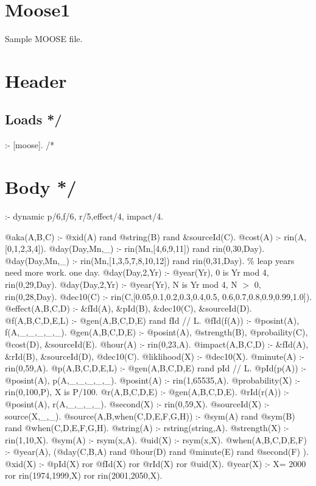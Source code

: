 \documentclass{article}
\begin{document}
\tableofcontents

\clearpage
\section{Moose1\label{Moose1}}


Sample MOOSE file.

\section{Header\label{Header}}
\subsection*{Loads */\label{Loads_}}


:- [moose]. /*

\section{Body */\label{Body_}}


:- dynamic p/6,f/6, r/5,effect/4, impact/4.



@aka(A,B,C) :- 
	@xid(A)
        rand @string(B) 
         rand \&sourceId(C).
@cost(A) :- 
	rin(A,[0,1,2,3,4]).
@day(Day,Mn,\_) :- 
	rin(Mn,[4,6,9,11]) 
        rand rin(0,30,Day).
@day(Day,Mn,\_) :- 
	rin(Mn,[1,3,5,7,8,10,12]) 
        rand rin(0,31,Day).
\% leap years need more work. one day.
@day(Day,2,Yr) :- 
	@year(Yr), 
	0 is Yr mod 4, 
	rin(0,29,Day).
@day(Day,2,Yr) :- 
	@year(Yr), 
	N is Yr mod 4, 
	N $>$ 0, 
	rin(0,28,Day).
@dec10(C) :-
	rin(C,[0.05,0.1,0.2,0.3,0.4,0.5,
               0.6,0.7,0.8,0.9,0.99,1.0]).
@effect(A,B,C,D) :-
	\&fId(A), 
	\&pId(B),
    \&dec10(C),
	\&sourceId(D). 
@f(A,B,C,D,E,L) :-
	@gen(A,B,C,D,E)
	rand fId // L.
@fId(f(A)) :-
	@posint(A),
	f(A,\_,\_,\_,\_,\_).
@gen(A,B,C,D,E) :-
	@posint(A),
	@strength(B), 
	@probaility(C),
	@cost(D),  
	\&sourceId(E).
@hour(A) :- 
	rin(0,23,A).
@impact(A,B,C,D) :-
	\&fId(A), 
	\&rId(B),
	\&sourceId(D), 
	@dec10(C).
@liklihood(X) :- 
	@dec10(X).
@minute(A) :- 
	rin(0,59,A).
@p(A,B,C,D,E,L) :-
	@gen(A,B,C,D,E)
	rand pId // L.
@pId(p(A)) :-
	@posint(A),
	p(A,\_,\_,\_,\_,\_).
@posint(A) :- 
	rin(1,65535,A).
@probability(X) :-
	rin(0,100,P),
	X is P/100.
@r(A,B,C,D,E) :-
	@gen(A,B,C,D,E).
@rId(r(A)) :-
	@posint(A),
	r(A,\_,\_,\_,\_).
@second(X) :- 
	rin(0,59,X).
@sourceId(X) :- 
	source(X,\_,\_).
@source(A,B,when(C,D,E,F,G,H)) :- 
	@sym(A) 
	rand @sym(B) 
        rand @when(C,D,E,F,G,H).
@string(A) :- rstring(string,A).
@strength(X) :- 
	rin(1,10,X).
@sym(A) :- 
	rsym(x,A).
@uid(X) :- rsym(x,X).
@when(A,B,C,D,E,F) :- 
	@year(A), 
        (@day(C,B,A) 
        rand @hour(D) 
        rand @minute(E)
	rand @second(F)
	).
@xid(X) :-
	@pId(X) ror @fId(X) ror  @rId(X) ror @uid(X).
@year(X) :- 
	X= 2000 
        ror rin(1974,1999,X) 
        ror rin(2001,2050,X).

\printindex
\end{document}
